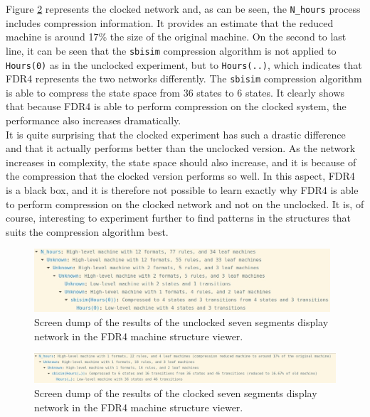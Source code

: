 Figure \ref{fig:clocked_compression} represents the clocked network and, as can be seen, the \texttt{N\_hours} process includes compression information. It provides an estimate that the reduced machine is around 17\% the size of the original machine. On the second to last line, it can be seen that the \texttt{sbisim} compression algorithm is not applied to \texttt{Hours(0)} as in the unclocked experiment, but to \texttt{Hours(..)}, which indicates that FDR4 represents the two networks differently. The \texttt{sbisim} compression algorithm is able to compress the state space from 36 states to 6 states. It clearly shows that because FDR4 is able to perform compression on the clocked system, the performance also increases dramatically.\\

It is quite surprising that the clocked experiment has such a drastic difference and that it actually performs better than the unclocked version. As the network increases in complexity, the state space should also increase, and it is because of the compression that the clocked version performs so well.
In this aspect, FDR4 is a black box, and it is therefore not possible to learn exactly why FDR4 is able to perform compression on the clocked network and not on the unclocked. It is, of course, interesting to experiment further to find patterns in the \cspm{} structures that suits the compression algorithm best.
\begin{figure}
    \includegraphics[width=0.98\textwidth]{./figures/unclocked_compression.jpg}
\caption{Screen dump of the results of the unclocked seven segments display network in the FDR4 machine structure viewer.}
\label{fig:unclocked_compression}
\end{figure}
\begin{figure}
    \includegraphics[width=1.02\textwidth]{./figures/clocked_compression.jpg}
\caption{Screen dump of the results of the clocked seven segments display network in the FDR4 machine structure viewer.}
\label{fig:clocked_compression}
\end{figure}

